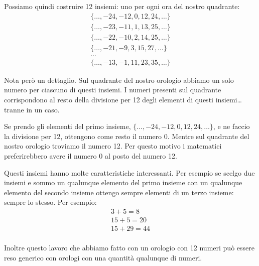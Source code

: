 Possiamo quindi costruire 12 insiemi: uno per ogni ora del nostro quadrante:
\begin{gather*}
    \{\dots, -24, -12, 0, 12, 24, \dots\} \\
    \{\dots, -23, -11, 1, 13, 25, \dots\} \\
    \{\dots, -22, -10, 2, 14, 25, \dots\} \\
    \{\dots, -21, -9, 3, 15, 27, \dots\} \\
    \dots \\
    \{\dots, -13, -1, 11, 23, 35, \dots\} 
\end{gather*}

Nota però un dettaglio.
Sul quadrante del nostro orologio abbiamo un solo numero per ciascuno di questi insiemi.
I numeri presenti sul quadrante corrispondono al resto della divisione per 12 degli elementi di questi insiemi\dots tranne in un caso.

Se prendo gli elementi del primo insieme, $\{\dots, -24, -12, 0, 12, 24, \dots\}$, e ne faccio la divisione per 12, ottengono come resto il numero 0.
Mentre sul quadrante del nostro orologio troviamo il numero 12.
Per questo motivo i matematici preferirebbero avere il numero 0 al posto del numero 12.

Questi insiemi hanno molte caratteristiche interessanti.
Per esempio se scelgo due insiemi e sommo un qualunque elemento del primo insieme con un qualunque elemento del secondo insieme ottengo sempre elementi di un terzo insieme: sempre lo stesso.
Per esempio:
\begin{gather*}
    3 + 5 = 8 \\
    15 + 5 = 20 \\
    15 + 29 = 44 \\
\end{gather*}

Inoltre questo lavoro che abbiamo fatto con un orologio con 12 numeri può essere reso generico con orologi con una quantità qualunque di numeri.
